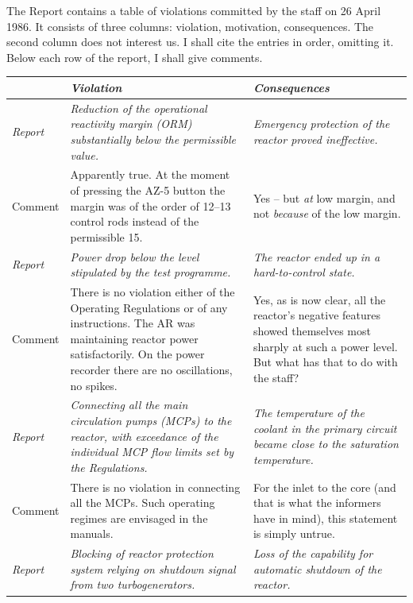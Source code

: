 \documentclass[openright]{bookest}
\begin{document}
The Report contains a table of violations committed by the staff on 26 April 1986. It consists of three columns: violation, motivation, consequences. The second column does not interest us. I shall cite the entries in order, omitting it. Below each row of the report, I shall give comments.

\small\begin{center}
  \begin{longtable}{|p{4em}|p{13.5em}|p{13.5em}|}
    \hline
    & \textit{Violation} & \textit{Consequences} \\
    \hline
    \textit{Report} & \textit{Reduction of the operational reactivity margin (ORM) substantially below the permissible value.} & \textit{Emergency protection of the reactor proved ineffective.} \\
    \hline
    Comment & Apparently true. At the moment of pressing the AZ-5 button the margin was of the order of \numrange{12}{13} control rods instead of the permissible \num{15}. & Yes -- but \textit{at} low margin, and not \textit{because} of the low margin. \\
    \hline
    \textit{Report} & \textit{Power drop below the level stipulated by the test programme.} & \textit{The reactor ended up in a hard-to-control state.} \\
    \hline
    Comment & There is no violation either of the Operating Regulations or of any instructions. The AR was maintaining reactor power satisfactorily. On the power recorder there are no oscillations, no spikes. & Yes, as is now clear, all the reactor's negative features showed themselves most sharply at such a power level. But what has that to do with the staff? \\
    \hline
    \textit{Report} & \textit{Connecting all the main circulation pumps (MCPs) to the reactor, with exceedance of the individual MCP flow limits set by the Regulations.} & \textit{The temperature of the coolant in the primary circuit became close to the saturation temperature.} \\
    \hline
    Comment & There is no violation in connecting all the MCPs. Such operating regimes are envisaged in the manuals. & For the inlet to the core (and that is what the informers have in mind), this statement is simply untrue. \\
    \hline
    \textit{Report} & \textit{Blocking of reactor protection system relying on shutdown signal from two turbogenerators.} & \textit{Loss of the capability for automatic shutdown of the reactor.} \\ 

\end{longtable}
\end{center}
\end{document}
